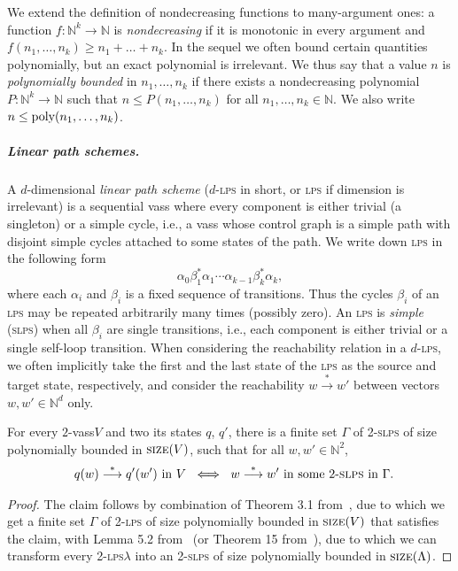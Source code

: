 \documentclass[a4paper, UKenglish, cleveref, autoref, thm-restate]{lipics-v2021}
\newcommand{\N}{\mathbb{N}}
\newcommand{\trans}[1]{\stackrel{#1}{\longrightarrow}}
\newcommand{\tran}{\trans{*}}
\newcommand{\slps}{\textsc{slps}\xspace}
\newcommand{\size}{\textsc{size}}
\newcommand{\poly}{\textup{poly}}
\newcommand{\LPS}{\lps}
\newcommand{\SLPS}{\slps}
\newcommand{\vass}{{\sc vass}\xspace}
\newcommand{\lps}{\textsc{lps}\xspace}
\newcommand{\dlps}{2-\lps}
\newcommand{\dslps}{2-\slps}
\newcommand{\dvass}{\parvass 2}
\newcommand{\parvass}[1]{{$#1$-\vass}\xspace}
\newcommand{\para}[1]{\vspace{-3mm}\subparagraph*{\bf #1.}}
\begin{document}
\begin{appendixproof}
We extend the definition of nondecreasing functions to many-argument ones:
a function $f: \N^k \to \N$ is \emph{nondecreasing} if it is monotonic
in every argument and $f(n_1, \ldots, n_k) \geq n_1 + \ldots + n_k$.
In the sequel we often bound certain quantities polynomially, but an exact polynomial is irrelevant. 
We thus say that a value $n$ is \emph{polynomially bounded} in $n_1, \ldots, n_k$
if there exists a nondecreasing polynomial $P: \N^k \to \N$ such that $n \leq P(n_1, \ldots, n_k)$
for all $n_1, \ldots, n_k \in \N$. 
We also write $n \leq \poly(n_1, \ldots, n_k)$.

\para{Linear path schemes}
A $d$-dimensional \emph{linear path scheme} ($d$-\LPS in short, or \LPS if dimension is irrelevant) 
is a sequential \vass where every component is either trivial (a singleton) or a simple cycle,
i.e., a \vass whose control graph is a simple path with disjoint simple cycles attached to some states of the path.
We write down \LPS in the following form 
\[
\alpha_0\beta_1^* \alpha_1 \cdots \alpha_{k-1} \beta_{k}^* \alpha_k,
\]
where each $\alpha_i$ and $\beta_i$ is  a fixed sequence of transitions. 
Thus the cycles $\beta_i$ of an \lps may be repeated arbitrarily many times (possibly zero). 
An \LPS is \emph{simple} (\SLPS) when all $\beta_i$ are single transitions, i.e.,
each component is either trivial or a single self-loop transition.
When considering the reachability relation in a $d$-\LPS, we often implicitly take the first and the last state
of the \LPS as the source and target state, respectively, and consider the reachability $w\tran w'$ between
vectors $w,w'\in\N^d$ only.






\begin{lemma}\label{lem:two-slps}
For every \dvass $V$ and two its states $q$, $q'$,
there is a finite set $\Gamma$ of \dslps of size polynomially bounded in $\size(V)$,
such that for all $w,w'\in\N^2$,
\begin{align*} \ \ q(w) \tran q'(w') \text{ in } V \ \iff \ w \tran w' \text{ in some  \dslps in } \Gamma.
\end{align*}
\end{lemma}

\begin{proof}
The claim follows by combination of
Theorem 3.1 from~\cite{DBLP:journals/jacm/BlondinEFGHLMT21}, due to which we get
a finite set $\Gamma$ of \dlps of size polynomially bounded in $\size(V)$ that satisfies the claim,
with Lemma 5.2 from~\cite{DBLP:journals/jacm/BlondinEFGHLMT21} 
(or Theorem 15 from~\cite{DBLP:conf/lics/EnglertLT16}), due to which
we can transform every \dlps $\lambda$ into an \dslps of size polynomially bounded in $\size(\Lambda)$.
\end{proof}










\end{appendixproof}
\end{document}
